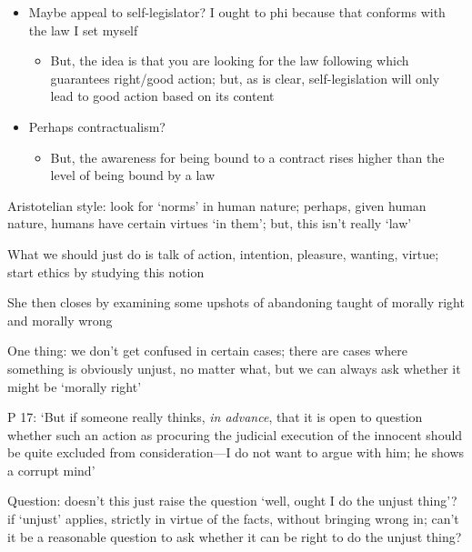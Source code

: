 \documentclass[11pt]{article}
\begin{document}
\begin{itemize}\item{Maybe appeal to self-legislator? I ought to phi because that conforms with the law I set myself}\begin{itemize}\item{But, the idea is that you are looking for the law following which guarantees right/good action; but, as is clear, self-legislation will only lead to good action based on its content}\end{itemize}\item{Perhaps contractualism?}\begin{itemize}\item{But, the awareness for being bound to a contract rises higher than the level of being bound by a law}\end{itemize}\end{itemize}

\noindent Aristotelian style: look for `norms' in human nature; perhaps, given human nature, humans have certain virtues `in them'; but, this isn't really `law'
\vspace*{2mm}

\noindent What we should just do is talk of action, intention, pleasure, wanting, virtue; start ethics by studying this notion
\vspace*{2mm}

\noindent She then closes by examining some upshots of abandoning taught of morally right and morally wrong
\vspace*{2mm}

\noindent One thing: we don't get confused in certain cases; there are cases where something is obviously unjust, no matter what, but we can always ask whether it might be `morally right'
\vspace*{2mm}

\noindent P 17: `But if someone really thinks, \emph{in advance}, that it is open to question whether such an action as procuring the judicial execution of the innocent should be quite excluded from consideration---I do not want to argue with him; he shows a corrupt mind' 
\vspace*{2mm}

\noindent Question: doesn't this just raise the question `well, ought I do the unjust thing'? if `unjust' applies, strictly in virtue of the facts, without bringing wrong in; can't it be a reasonable question to ask whether it can be right to do the unjust thing?
\vspace*{2mm}
\end{document}
